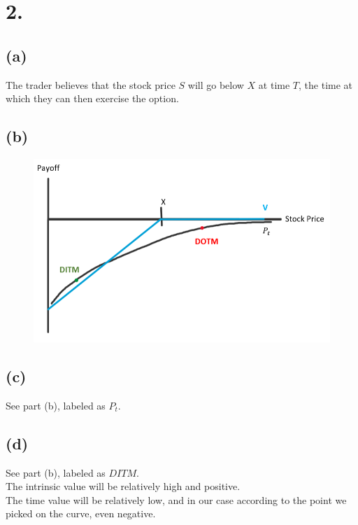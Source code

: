 \documentclass{article}
\begin{document}
\section*{2.}
{\Large

\subsection*{(a)}

The trader believes that the stock price $S$ will go below $X$ at time $T$, the time at which they can then exercise the option. 

\subsection*{(b)}

\begin{figure}[h]
  \centering
  \includegraphics[width=120mm]{./2flip.png}
\end{figure}

\subsection*{(c)}

See part (b), labeled as $P_t$.

\subsection*{(d)}

See part (b), labeled as $DITM$. \\
The intrinsic value will be relatively high and positive. \\
The time value will be relatively low, and in our case according to the point we picked on the curve, even negative.

}
\end{document}
